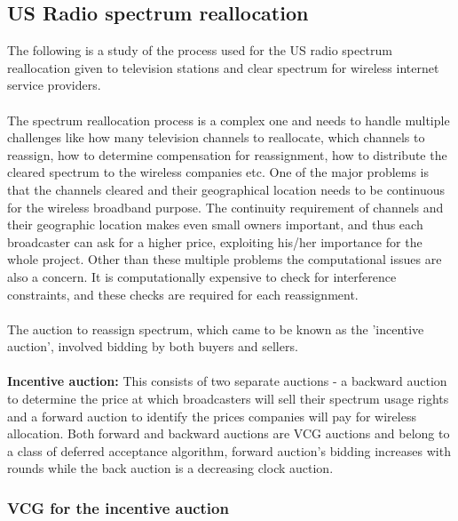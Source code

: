 \documentclass[a4paper]{article}
\begin{document}
\subsection*{US Radio spectrum reallocation}

The following is a study of the process used for the US radio spectrum reallocation given to television stations and clear spectrum for wireless internet service providers.
\\\\
The spectrum reallocation process is a complex one and needs to handle multiple challenges like how many television channels to reallocate, which channels to reassign, how to determine compensation for reassignment, how to distribute the cleared spectrum to the wireless companies etc. One of the major problems is that the channels cleared and their geographical location needs to be continuous for the wireless broadband purpose. The continuity requirement of channels and their geographic location makes even small owners important, and thus each broadcaster can ask for a higher price, exploiting his/her importance for the whole project. Other than these multiple problems the computational issues are also a concern. It is computationally expensive to check for interference constraints, and these checks are required for each reassignment.
\\\\
The auction to reassign spectrum, which came to be known as the 'incentive auction', involved bidding by both buyers and sellers.
\\\\
\textbf{Incentive auction:} This consists of two separate auctions - a backward auction to determine the price at which broadcasters will sell their spectrum usage rights and a forward auction to identify the prices companies will pay for wireless allocation. Both forward and backward auctions are VCG auctions and belong to a class of deferred acceptance algorithm, forward auction's bidding increases with rounds while the back auction is a decreasing clock auction.

\subsubsection*{VCG for the incentive auction}
\end{document}
